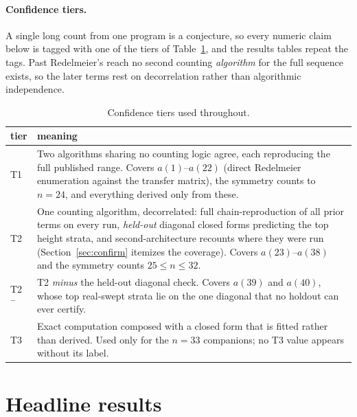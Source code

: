 \documentclass[11pt]{article}
\newcommand{\tierone}{\textsf{T1}}
\newcommand{\tiertwo}{\textsf{T2}}
\newcommand{\tierthree}{\textsf{T3}}
\newcommand{\tiertwominus}{\textsf{T2}$^{-}$}
\begin{document}
\paragraph{Confidence tiers.}
A single long count from one program is a conjecture, so every
numeric claim below is tagged with one of the tiers of
Table~\ref{tab:tiers}, and the results tables repeat the tags. Past
Redelmeier's reach no second
counting \emph{algorithm} for the full sequence exists, so the later terms
rest on decorrelation rather than algorithmic independence.

\begin{table}[H]
  \centering\small
  \begin{tabular}{l p{}}
    \toprule
    tier & meaning \\
    \midrule
    \tierone{} & Two algorithms sharing no counting logic agree, each
    reproducing the full published range. Covers $a(1)$--$a(22)$ (direct
    Redelmeier enumeration against the transfer matrix), the symmetry counts
    to $n=24$, and everything derived only from these. \\
    \tiertwo{} & One counting algorithm, decorrelated: full
    chain-reproduction of all prior terms on every run, \emph{held-out}
    diagonal closed forms predicting the top height strata, and
    second-architecture recounts where they were run
    (Section~\ref{sec:confirm} itemizes the coverage). Covers
    $a(23)$--$a(38)$ and the symmetry counts $25\le n\le32$. \\
    \tiertwominus{} & \tiertwo{} \emph{minus} the held-out diagonal check.
    Covers $a(39)$ and $a(40)$, whose top real-swept strata lie on the one
    diagonal that no holdout can ever certify. \\
    \tierthree{} & Exact computation composed with a closed form that is
    fitted rather than derived. Used only for the $n=33$ companions; no
    \tierthree{} value appears without its label. \\
    \bottomrule
  \end{tabular}
  \caption{Confidence tiers used throughout.}
  \label{tab:tiers}
\end{table}

\section{Headline results}
\label{sec:result}
\end{document}
